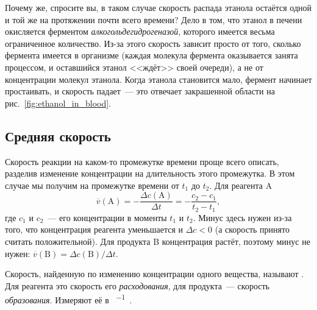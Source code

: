 Почему же, спросите вы, в таком случае скорость распада этанола остаётся одной и той же на протяжении почти всего времени? Дело в том, что этанол в печени окисляется ферментом \emph{алкогольдегидрогеназой}, которого имеется весьма ограниченное количество. Из-за этого скорость зависит просто от того, сколько фермента имеется в организме (каждая молекула фермента оказывается занята процессом, и оставшийся этанол <<ждёт>> своей очереди), а не от концентрации молекул этанола. Когда этанола становится мало, фермент начинает простаивать, и скорость падает~--- это отвечает закрашенной области на рис.~\ref{fig:ethanol_in_blood}.

\subsection*{Средняя скорость}

Скорость реакции на каком-то промежутке времени проще всего описать, разделив изменение концентрации на длительность этого промежутка. В этом случае мы получим  на промежутке времени от $t_1$ до $t_2$. Для реагента A
\begin{equation}
    \label{eq:average_rate}
    \overline{v}(\mathrm{A}) = -\frac{\Delta c(\mathrm{A})}{\Delta t} = -\frac{c_2 - c_1}{t_2 - t_1},
\end{equation}
где $c_1$ и $c_2$~--- его концентрации в моменты $t_1$ и $t_2$. Минус здесь нужен из-за того, что концентрация реагента уменьшается и $\Delta c < 0$ (а скорость принято считать положительной). Для продукта B концентрация растёт, поэтому минус не нужен: $\overline{v}(\mathrm{B}) = \Delta c(\mathrm{B})/\Delta t$.

Скорость, найденную по изменению концентрации одного вещества, называют . Для реагента это скорость его \emph{расходования}, для продукта~--- скорость \emph{образования}. Измеряют её в \unit{\ruMole\per\ruL\ruS}.

